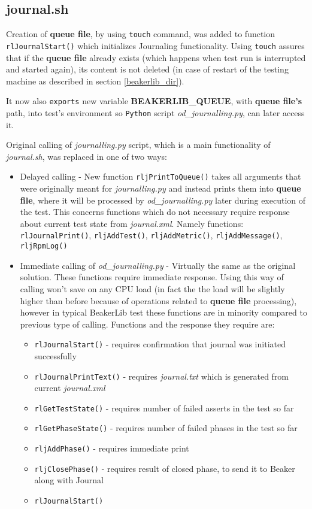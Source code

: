 \subsection{journal.sh}
Creation of  \textbf{queue file}, by using \texttt{touch} command, was added to function \texttt{rlJournalStart()} which initializes Journaling functionality. Using \texttt{touch} assures that if the \textbf{queue file} already exists (which happens when test run is interrupted and started again), its content is not deleted (in case of restart of the testing machine as described in section \ref{beakerlib_dir}).

It now also \texttt{exports} new variable \textbf{BEAKERLIB\_QUEUE}, with \textbf{queue file's} path, into test's environment so \texttt{Python} script \textit{od\_journalling.py}, can later access it.

Original calling of \textit{journalling.py} script, which is a main functionality of \textit{journal.sh}, was replaced in one of two ways:

\begin{itemize}
\item Delayed calling - New function \texttt{rljPrintToQueue()} takes all arguments that were originally meant for \textit{journalling.py} and instead prints them into \textbf{queue file}, where it will be processed by \textit{od\_journalling.py} later during execution of the test. This concerns functions which do not necessary require response about current test state from \textit{journal.xml}.  Namely functions: \texttt{rlJournalPrint()}, \texttt{rljAddTest()}, \texttt{rljAddMetric()}, \texttt{rljAddMessage()}, \texttt{rljRpmLog()}
\item Immediate calling of \textit{od\_journalling.py} - Virtually the same as the original solution. These functions require immediate response. Using this way of calling won't save on any CPU load (in fact the the load will be slightly higher than before because of operations related to \textbf{queue file} processing), however in typical BeakerLib test these functions are in minority compared to previous type of calling.  Functions and the response they require are:  
\begin{itemize}
\item \texttt{rlJournalStart()} - requires confirmation that journal was initiated successfully
\item \texttt{rlJournalPrintText()} - requires \textit{journal.txt} which is generated from current \mbox{\textit{journal.xml}}
\item \texttt{rlGetTestState()}  - requires number of failed asserts in the test so far
\item \texttt{rlGetPhaseState()} - requires number of failed phases in the test so far
\item \texttt{rljAddPhase()} - requires immediate print
\item \texttt{rljClosePhase()} - requires result of closed phase, to send it to Beaker along with Journal
\item \texttt{rlJournalStart()}
\end{itemize}
\end{itemize}

